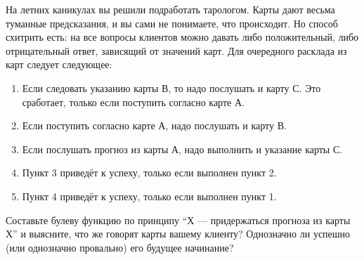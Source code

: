 \question
На летних каникулах вы решили подработать тарологом. Карты дают весьма туманные предсказания, и вы сами не понимаете, что происходит. Но способ схитрить есть: на все вопросы клиентов можно давать либо положительный, либо отрицательный ответ, зависящий от значений карт. Для очередного расклада из карт следует следующее:

\begin{enumerate}
    \item Если следовать указанию карты В, то надо послушать и карту С. Это сработает, только если поступить согласно карте А.
\item Если поступить согласно карте А, надо послушать и карту В.
\item Если послушать прогноз из карты А, надо выполнить и указание карты С.
\item Пункт 3 приведёт к успеху, только если выполнен пункт 2.
\item Пункт 4 приведёт к успеху, только если выполнен пункт 1.
\end{enumerate}

Составьте булеву функцию по принципу “Х — придержаться прогноза из карты Х” и выясните, что же говорят карты вашему клиенту? Однозначно ли успешно (или однозначно провально) его будущее начинание?